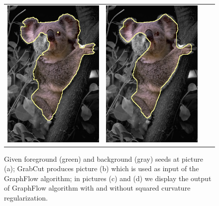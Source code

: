 \begin{figure}
\begin{tabular}{cccc}
 	\includegraphics[scale=0.25]{figures/chapter8/segmentation/coala/k-0.0/corrected-seg.png} &  	
 	\includegraphics[scale=0.25]{figures/chapter8/segmentation/coala/k-0.5/corrected-seg.png}
\end{tabular}	
\caption{Given foreground (green) and background (gray) seeds at picture (a); GrabCut produces picture (b) which is used as input of the GraphFlow algorithm; in pictures (c) and (d) we display the output of GraphFlow algorithm with and without squared curvature regularization. }
\label{ch8:fig:segmentation}
\end{figure}

